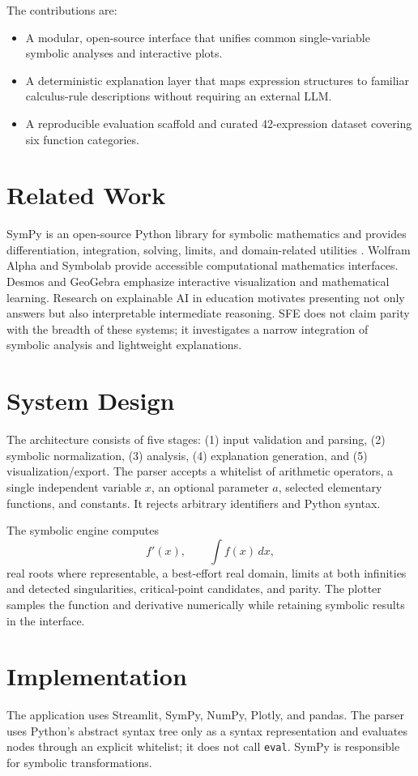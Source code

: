 \documentclass[11pt]{article}
\begin{document}
The contributions are:
\begin{itemize}
\item A modular, open-source interface that unifies common single-variable symbolic analyses and interactive plots.
\item A deterministic explanation layer that maps expression structures to familiar calculus-rule descriptions without requiring an external LLM.
\item A reproducible evaluation scaffold and curated 42-expression dataset covering six function categories.
\end{itemize}

\section{Related Work}
SymPy is an open-source Python library for symbolic mathematics and provides differentiation, integration, solving, limits, and domain-related utilities \cite{meurer2017sympy}. Wolfram Alpha and Symbolab provide accessible computational mathematics interfaces. Desmos and GeoGebra emphasize interactive visualization and mathematical learning. Research on explainable AI in education motivates presenting not only answers but also interpretable intermediate reasoning. SFE does not claim parity with the breadth of these systems; it investigates a narrow integration of symbolic analysis and lightweight explanations.

\section{System Design}
The architecture consists of five stages: (1) input validation and parsing, (2) symbolic normalization, (3) analysis, (4) explanation generation, and (5) visualization/export. The parser accepts a whitelist of arithmetic operators, a single independent variable \(x\), an optional parameter \(a\), selected elementary functions, and constants. It rejects arbitrary identifiers and Python syntax.

The symbolic engine computes
\[
f'(x), \qquad \int f(x)\,dx,
\]
real roots where representable, a best-effort real domain, limits at both infinities and detected singularities, critical-point candidates, and parity. The plotter samples the function and derivative numerically while retaining symbolic results in the interface.

\section{Implementation}
The application uses Streamlit, SymPy, NumPy, Plotly, and pandas. The parser uses Python's abstract syntax tree only as a syntax representation and evaluates nodes through an explicit whitelist; it does not call \texttt{eval}. SymPy is responsible for symbolic transformations.
\end{document}
